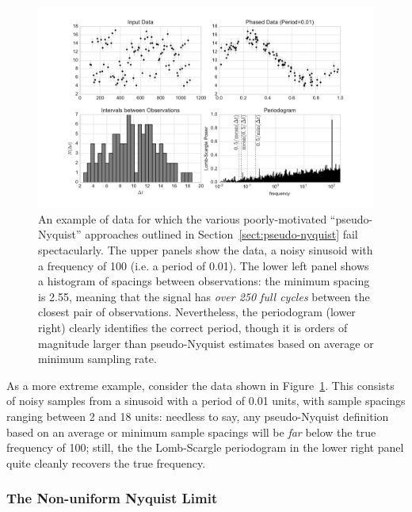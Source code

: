 \documentclass[preprint]{aastex}
\newcommand{\fig}[1]{Figure~\ref{fig:#1}}
\newcommand{\figlabel}[1]{\label{fig:#1}}
\newcommand{\Sect}[1]{Section~\ref{sect:#1}}
\newcommand{\sect}[1]{\Sect{#1}}
\begin{document}
\begin{figure}[ht]
  \centering
  \includegraphics[width=\textwidth]{fig12_pseudo_nyquist}
  \caption{An example of data for which the various poorly-motivated
    ``pseudo-Nyquist'' approaches outlined in \sect{pseudo-nyquist} fail
    spectacularly. The upper panels show the data, a noisy sinusoid with
    a frequency of 100 (i.e. a period of 0.01).
    The lower left panel shows a histogram of spacings between observations:
    the minimum spacing is 2.55, meaning that the signal has
    {\it over 250 full cycles} between the closest pair of observations.
    Nevertheless, the periodogram (lower right) clearly identifies the correct
    period, though it is orders of magnitude larger than pseudo-Nyquist
    estimates based on average or minimum sampling rate.
    \figlabel{pseudo-nyquist}}
\end{figure}

As a more extreme example, consider the data shown in \fig{pseudo-nyquist}.
This consists of noisy samples from a sinusoid with a period of 0.01 units,
with sample spacings ranging between 2 and 18 units: needless to say, any
pseudo-Nyquist definition based on an average or minimum sample spacings
will be {\it far} below the true frequency of 100; still, the
the Lomb-Scargle periodogram in the lower right panel quite cleanly
recovers the true frequency.

\subsubsection{The Non-uniform Nyquist Limit}
\end{document}
